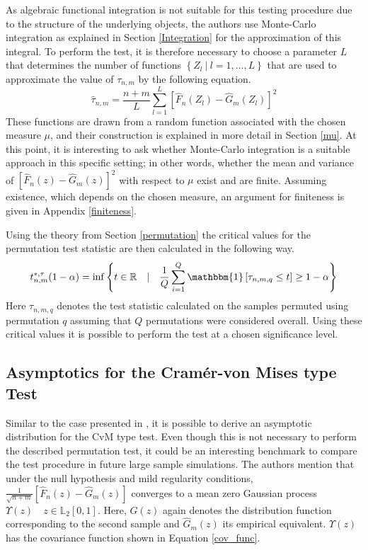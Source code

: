 \documentclass[12pt, a4paper]{article}
\theoremstyle{MAstyle} \newtheorem{assumption}{Assumption}[section]
\theoremstyle{MAstyle} \newtheorem{definition}{Definition}[section]
\theoremstyle{MAstyle} \newtheorem{theorem}{Theorem}[section]
\begin{document}
			As algebraic functional integration is not suitable for this testing procedure due to the structure of the underlying objects, the authors use Monte-Carlo integration as explained in Section \ref{Integration} for the approximation of this integral. To perform the test, it is therefore necessary to choose a parameter $L$ that determines the number of functions $\left\{Z_l \ \vert \ l = 1, \dots, L\right\}$ that are used to approximate the value of $\tau_{n,m}$ by the following equation.
			\begin{equation}\label{tau_hat}
				\hat{\tau}_{n,m} = \frac{n+m}{L} \sum_{l = 1}^{L} \left[\hat{F}_n(Z_l) - \hat{G}_m(Z_l)\right]^2
			\end{equation}
			These functions are drawn from a random function associated with the chosen measure $\mu$, and their construction is explained in more detail in Section \ref{mu}. At this point, it is interesting to ask whether Monte-Carlo integration is a suitable approach in this specific setting; in other words, whether the mean and variance of $\left[\hat{F}_n(z) - \hat{G}_m(z)\right]^2$ with respect to $\mu$ exist and are finite.
			Assuming existence, which depends on the chosen measure, an argument for finiteness is given in Appendix \ref{finiteness}.
		
			Using the theory from Section \ref{permutation} the critical values for the permutation test statistic are then calculated in the following way. 
			\begin{equation}
				t^{*, \tau}_{n,m}(1-\alpha) = \inf \left\{t \in \mathbb{R} \quad \vert \quad \frac{1}{Q} \sum_{i = 1}^{Q} \mathbbm{1}\left[\tau_{n,m,q} \leq t\right] \geq 1 - \alpha \right\}
			\end{equation}
			Here $\tau_{n,m,q}$ denotes the test statistic calculated on the samples permuted using permutation $q$ assuming that $Q$ permutations were considered overall. Using these critical values it is possible to perform the test at a chosen significance level.
		
		\subsection{Asymptotics for the Cram\'{e}r-von Mises type Test}\label{asymp}
			Similar to the case presented in \cite{bugni_goodness--fit_2009}, it is possible to derive an asymptotic distribution for the CvM type test. Even though this is not necessary to perform the described permutation test, it could be an interesting benchmark to compare the test procedure in future large sample simulations. The authors mention that under the null hypothesis and mild regularity conditions, $\frac{1}{\sqrt{n+m}}\left[\hat{F}_n(z) - \hat{G}_m(z)\right]$ converges to a mean zero Gaussian process $\Upsilon(z) \quad z \in \mathbb{L}_2[0,1]$. Here, $G(z)$ again denotes the distribution function corresponding to the second sample and $\hat{G}_m(z)$ its empirical equivalent. $\Upsilon(z)$ has the covariance function shown in Equation \ref{cov_func}. 
			
\end{document}
